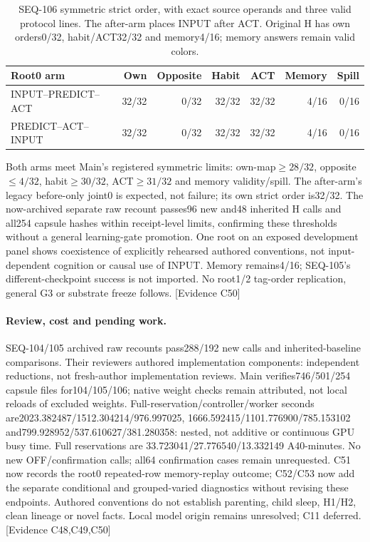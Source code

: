\documentclass[11pt]{article}
\newcommand{\ev}[1]{\textsf{[Evidence #1]}}
\begin{document}
\begin{table}[ht]
\centering\small
\begin{tabular}{lrrrrrr}
\toprule
Root0 arm & Own & Opposite & Habit & ACT & Memory & Spill \\
\midrule
INPUT--PREDICT--ACT & 32/32 & 0/32 & 32/32 & 32/32 & 4/16 & 0/16 \\
PREDICT--ACT--INPUT & 32/32 & 0/32 & 32/32 & 32/32 & 4/16 & 0/16 \\
\bottomrule
\end{tabular}
\caption{SEQ-106 symmetric strict order, with exact source operands and three
valid protocol lines. The after-arm places INPUT after ACT. Original H has own orders0/32,
habit/ACT32/32 and memory4/16; memory answers remain valid colors.}
\label{tab:seq106-twohabit}
\end{table}

Both arms meet Main's registered symmetric limits: own-map$\geq28/32$,
opposite$\leq4/32$, habit$\geq30/32$, ACT$\geq31/32$ and memory validity/spill.
The after-arm's legacy before-only joint0 is expected, not failure; its own
strict order is32/32. The now-archived separate raw recount passes96 new and48
inherited H calls and all254 capsule hashes within receipt-level limits,
confirming these thresholds without a general learning-gate promotion. One root on
an exposed development panel shows coexistence of explicitly rehearsed
authored conventions, not input-dependent cognition or causal use of INPUT.
Memory remains4/16; SEQ-105's different-checkpoint success is not imported.
No root1/2 tag-order replication, general G3 or substrate freeze follows. \ev{C50}

\paragraph{Review, cost and pending work.} SEQ-104/105 archived raw recounts
pass288/192 new calls and inherited-baseline comparisons. Their reviewers
authored implementation components: independent reductions, not fresh-author
implementation reviews. Main verifies746/501/254 capsule files for104/105/106;
native weight checks remain attributed, not local reloads of excluded weights.
Full-reservation/controller/worker seconds are2023.382487/1512.304214/976.997025,
1666.592415/1101.776900/785.153102 and799.928952/537.610627/381.280358:
nested, not additive or continuous GPU busy time. Full reservations are
33.723041/27.776540/13.332149 A40-minutes. No new OFF/confirmation calls;
all64 confirmation cases remain unrequested. C51 now records the root0
repeated-row memory-replay outcome; C52/C53 now add the separate conditional
and grouped-varied diagnostics without revising these endpoints.
Authored conventions do not establish parenting, child sleep, H1/H2, clean
lineage or novel facts. Local model origin remains unresolved; C11 deferred.
\ev{C48,C49,C50}
\end{document}
